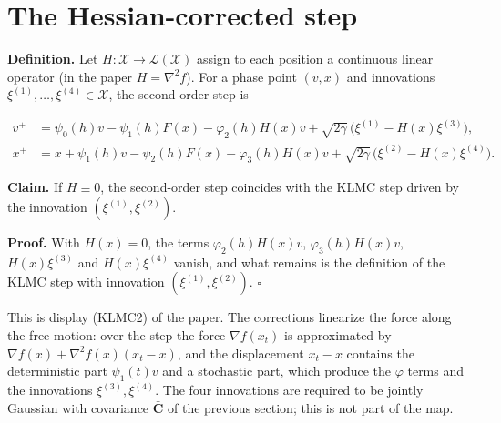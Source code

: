 \documentclass[11pt,a4paper]{article}
\begin{document}
\section{\texorpdfstring{The Hessian-corrected step}{The Hessian-corrected step}}


\textbf{Definition.} Let \(H:\mathcal X\to\mathcal L(\mathcal X)\) assign to each position a continuous linear operator (in the paper \(H=\nabla^2f\)). For a phase point \((v,x)\) and innovations \(\xi^{(1)},\dots,\xi^{(4)}\in\mathcal X\), the second-order step is


\[\begin{aligned}
v^+&=\psi_0(h)v-\psi_1(h)F(x)-\varphi_2(h)H(x)v+\sqrt{2\gamma}\,\bigl(\xi^{(1)}-H(x)\xi^{(3)}\bigr),\\
x^+&=x+\psi_1(h)v-\psi_2(h)F(x)-\varphi_3(h)H(x)v+\sqrt{2\gamma}\,\bigl(\xi^{(2)}-H(x)\xi^{(4)}\bigr).
\end{aligned}\]


\textbf{Claim.} If \(H\equiv0\), the second-order step coincides with the KLMC step driven by the innovation \((\xi^{(1)},\xi^{(2)})\).




\textbf{Proof.} With \(H(x)=0\), the terms \(\varphi_2(h)H(x)v\), \(\varphi_3(h)H(x)v\), \(H(x)\xi^{(3)}\) and \(H(x)\xi^{(4)}\) vanish, and what remains is the definition of the KLMC step with innovation \((\xi^{(1)},\xi^{(2)})\). \(\square\)




This is display (KLMC2) of the paper. The corrections linearize the force along the free motion: over the step the force \(\nabla f(x_t)\) is approximated by \(\nabla f(x)+\nabla^2f(x)(x_t-x)\), and the displacement \(x_t-x\) contains the deterministic part \(\psi_1(t)v\) and a stochastic part, which produce the \(\varphi\) terms and the innovations \(\xi^{(3)},\xi^{(4)}\). The four innovations are required to be jointly Gaussian with covariance \(\bar{\mathbf C}\) of the previous section; this is not part of the map.
\end{document}
